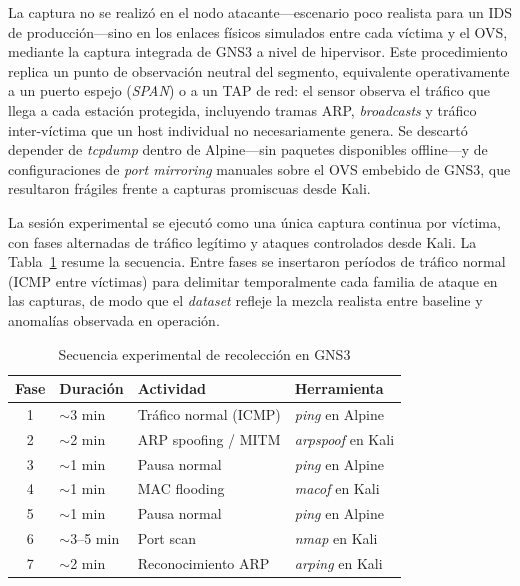 \documentclass[conference]{IEEEtran}
\begin{document}
La captura no se realizó en el nodo atacante---escenario poco realista
para un IDS de producción---sino en los enlaces físicos simulados entre
cada víctima y el OVS, mediante la captura integrada de GNS3 a nivel de
hipervisor. Este procedimiento replica un punto de observación neutral
del segmento, equivalente operativamente a un puerto espejo (\textit{SPAN})
o a un TAP de red: el sensor observa el tráfico que llega a cada
estación protegida, incluyendo tramas ARP, \textit{broadcasts} y tráfico
inter-víctima que un host individual no necesariamente genera. Se
descartó depender de \textit{tcpdump} dentro de Alpine---sin paquetes
disponibles offline---y de configuraciones de \textit{port mirroring}
manuales sobre el OVS embebido de GNS3, que resultaron frágiles frente a
capturas promiscuas desde Kali.

La sesión experimental se ejecutó como una única captura continua por
víctima, con fases alternadas de tráfico legítimo y ataques controlados
desde Kali. La Tabla~\ref{tab:secuencia_ataques} resume la secuencia.
Entre fases se insertaron períodos de tráfico normal (ICMP entre
víctimas) para delimitar temporalmente cada familia de ataque en las
capturas, de modo que el \textit{dataset} refleje la
mezcla realista entre baseline y anomalías observada en operación.

\begin{table}[htbp]
\caption{Secuencia experimental de recolección en GNS3}
\label{tab:secuencia_ataques}
\centering
\renewcommand{\arraystretch}{1.15}
\begin{tabular}{clll}
\hline
\textbf{Fase} & \textbf{Duración} & \textbf{Actividad} & \textbf{Herramienta} \\
\hline
1 & $\sim$3 min & Tráfico normal (ICMP) & \textit{ping} en Alpine \\
2 & $\sim$2 min & ARP spoofing / MITM & \textit{arpspoof} en Kali \\
3 & $\sim$1 min & Pausa normal & \textit{ping} en Alpine \\
4 & $\sim$1 min & MAC flooding & \textit{macof} en Kali \\
5 & $\sim$1 min & Pausa normal & \textit{ping} en Alpine \\
6 & $\sim$3--5 min & Port scan & \textit{nmap} en Kali \\
7 & $\sim$2 min & Reconocimiento ARP & \textit{arping} en Kali \\
\hline
\end{tabular}
\end{table}
\end{document}
